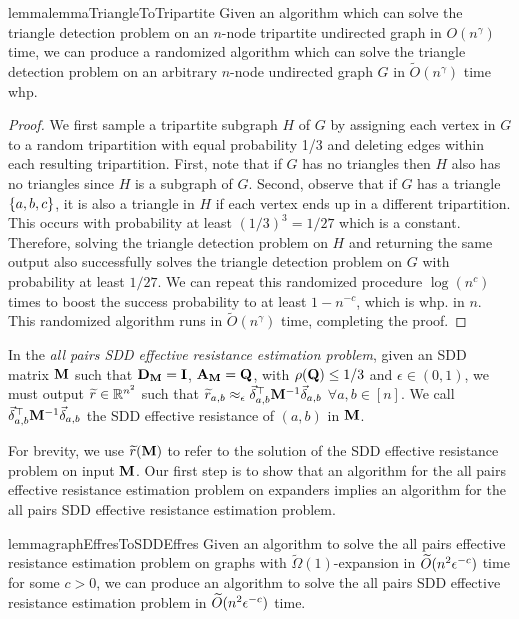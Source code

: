 \begin{restatable}{lemma}{lemmaTriangleToTripartite}\label{lemma:tripartite_to_normal_tridetect}
Given an algorithm which can solve the triangle detection problem on an $n$-node tripartite undirected graph in $O(n^\gamma)$ time, we can produce a randomized algorithm which can solve the triangle detection problem on an arbitrary $n$-node undirected graph $G$ in $\widetilde{O}(n^\gamma)$ time whp.
\end{restatable}
\begin{proof}
    We first sample a tripartite subgraph $H$ of $G$ by assigning each vertex in $G$ to a random tripartition with equal probability 1/3 and deleting edges within each resulting tripartition. First, note that if $G$ has no triangles then $H$ also has no triangles since $H$ is a subgraph of $G$. Second, observe that if $G$ has a triangle $\left\{ a,b,c \right\}$, it is also a triangle in $H$ if each vertex ends up in a different tripartition. This occurs with probability at least $(1/3)^3 = 1/27$ which is a constant. Therefore, solving the triangle detection problem on $H$ and returning the same output also successfully solves the triangle detection problem on $G$ with probability at least $1/27$. We can repeat this randomized procedure $\log (n^c)$ times to boost the success probability to at least $1 - n^{-c}$, which is whp. in $n$. This randomized algorithm runs in $\widetilde{O}(n^\gamma)$ time, completing the proof.
\end{proof}


\begin{definition}\label{def:Reff_SDD} In the \emph{all pairs SDD effective resistance estimation problem}, given an SDD matrix $\mathbf{M}$ such that ${\mathbf{D}}_{\mathbf{M}} = \mathbf{I}$, ${\mathbf{A}}_{\mathbf{M}} = \mathbf{Q}$, with $\rho(\mathbf{Q}) \leq 1/3$ and $\epsilon \in (0, 1)$, we must output $\widetilde{r} \in \mathbb{R}^{n^2}$ such that $\widetilde{r}_{a,b} \approx_\epsilon \vec{\delta}_{a,b}^\top \mathbf{M}^{-1}\vec{\delta}_{a,b}$ $\forall a, b \in [n]$. We call $\vec{\delta}_{a,b}^\top \mathbf{M}^{-1}\vec{\delta}_{a,b}$ the SDD effective resistance of $(a, b)$ in $\mathbf{M}$. 
\end{definition}

For brevity, we use $\widetilde{r}(\mathbf{M})$ to refer to the solution of the SDD effective resistance problem on input $\mathbf{M}$. Our first step is to show that an algorithm for the all pairs effective resistance estimation problem on expanders implies an algorithm for the all pairs SDD effective resistance estimation problem.

\begin{restatable}{lemma}{graphEffresToSDDEffres}\label{lemma:grapheffres_to_sddeffres} 
Given an algorithm to solve the all pairs effective resistance estimation problem on graphs with $\widetilde{\Omega}(1)$-expansion in $\widetilde{O}( {n^2\epsilon^{-c}} )$ time for some $c > 0$, we can produce an algorithm to solve the all pairs SDD effective resistance estimation problem in $\widetilde{O}( {n^2 \epsilon^{-c}} )$ time. 
\end{restatable}

